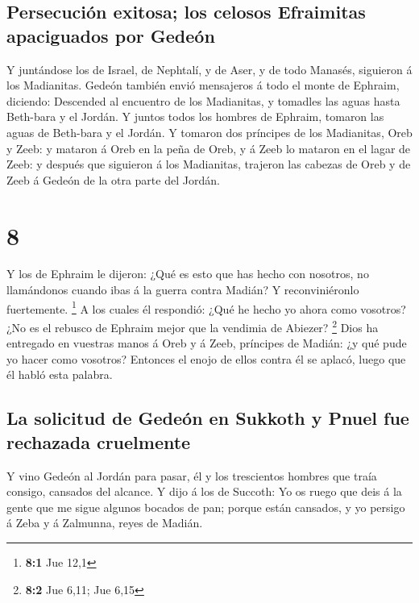\hypertarget{persecuciuxf3n-exitosa-los-celosos-efraimitas-apaciguados-por-gedeuxf3n}{%
\subsection{Persecución exitosa; los celosos Efraimitas apaciguados por
Gedeón}\label{persecuciuxf3n-exitosa-los-celosos-efraimitas-apaciguados-por-gedeuxf3n}}

 Y juntándose los de Israel, de Nephtalí, y de Aser, y de
todo Manasés, siguieron á los Madianitas.  Gedeón también
envió mensajeros á todo el monte de Ephraim, diciendo: Descended al
encuentro de los Madianitas, y tomadles las aguas hasta Beth-bara y el
Jordán. Y juntos todos los hombres de Ephraim, tomaron las aguas de
Beth-bara y el Jordán.  Y tomaron dos príncipes de los
Madianitas, Oreb y Zeeb: y mataron á Oreb en la peña de Oreb, y á Zeeb
lo mataron en el lagar de Zeeb: y después que siguieron á los
Madianitas, trajeron las cabezas de Oreb y de Zeeb á Gedeón de la otra
parte del Jordán.

\hypertarget{section-7}{%
\section{8}\label{section-7}}

 Y los de Ephraim le dijeron: ¿Qué es esto que has hecho con
nosotros, no llamándonos cuando ibas á la guerra contra Madián? Y
reconviniéronlo fuertemente. \footnote{\textbf{8:1} Jue 12,1}
 A los cuales él respondió: ¿Qué he hecho yo ahora como
vosotros? ¿No es el rebusco de Ephraim mejor que la vendimia de Abiezer?
\footnote{\textbf{8:2} Jue 6,11; Jue 6,15}  Dios ha
entregado en vuestras manos á Oreb y á Zeeb, príncipes de Madián: ¿y qué
pude yo hacer como vosotros? Entonces el enojo de ellos contra él se
aplacó, luego que él habló esta palabra.

\hypertarget{la-solicitud-de-gedeuxf3n-en-sukkoth-y-pnuel-fue-rechazada-cruelmente}{%
\subsection{La solicitud de Gedeón en Sukkoth y Pnuel fue rechazada
cruelmente}\label{la-solicitud-de-gedeuxf3n-en-sukkoth-y-pnuel-fue-rechazada-cruelmente}}

 Y vino Gedeón al Jordán para pasar, él y los trescientos
hombres que traía consigo, cansados del alcance.  Y dijo á
los de Succoth: Yo os ruego que deis á la gente que me sigue algunos
bocados de pan; porque están cansados, y yo persigo á Zeba y á Zalmunna,
reyes de Madián.

